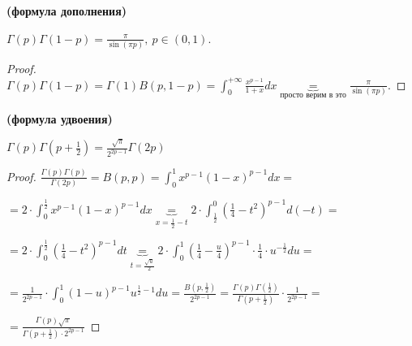 \begin{consequence} \textbf{(формула дополнения)}

    $\Gamma(p) \Gamma(1-p) = \frac{\pi}{\sin(\pi p)}, \ p \in (0, 1)$.
\end{consequence}
\begin{proof}
    $\Gamma(p) \Gamma(1 - p) = \Gamma(1) B(p, 1 - p) = \int_{0}^{+\infty} { \frac{x^{p-1}}{1+x} dx } \underbrace{=}_{\text{просто верим в это}} \frac{\pi}{\sin(\pi p)}$.
\end{proof}



\begin{consequence} \textbf{(формула удвоения)}

    $\Gamma(p)\Gamma(p + \frac{1}{2}) = \frac{\sqrt[]{\pi}}{2^{2p - 1}}\Gamma(2p)$
\end{consequence}

\begin{proof}


    $\frac{\Gamma(p) \Gamma(p)}{\Gamma(2p)} = B(p, p) = \int_{0}^{1} {x^{p - 1} (1 - x)^{p - 1} dx} =$
    
    $= 2 \cdot \int_{0}^{\frac{1}{2}} { x^{p - 1} (1 - x)^{p - 1} dx } \underbrace{=}_{x = \frac{1}{2} - t} 2 \cdot \int_{\frac{1}{2}}^{0} { \left( \frac{1}{4} - t^2 \right)^{p - 1} d(-t) } =$
    
    $= 2 \cdot \int_{0}^{\frac{1}{2}} { \left( \frac{1}{4} - t^2 \right)^{p - 1} dt } \underbrace{=}_{t = \frac{\sqrt{u}}{2}} 2 \cdot \int_{0}^{1} {\left( \frac{1}{4} - \frac{u}{4} \right)^{p-1} \cdot \frac{1}{4} \cdot u^{-\frac{1}{2}} du} =$
    
    $= \frac{1}{2^{2p - 1}} \cdot \int_{0}^{1} { (1 - u)^{p - 1} u^{\frac{1}{2} - 1} du } = \frac{B(p, \frac{1}{2})}{2^{2p - 1}} = \frac{\Gamma(p) \Gamma(\frac{1}{2})}{\Gamma(p + \frac{1}{2})} \cdot \frac{1}{2^{2p - 1}} =$
    
    $= \frac{\Gamma(p) \sqrt{\pi}}{\Gamma(p + \frac{1}{2}) \cdot 2^{2p - 1}}$

\end{proof}


